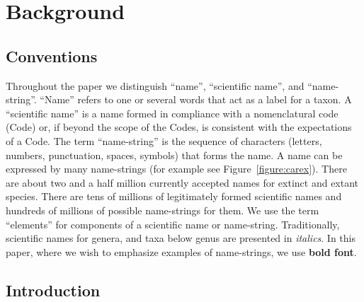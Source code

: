 \documentclass{bmcart}
\begin{document}



\section*{Background}

\subsection*{Conventions}

Throughout the paper we distinguish ``name'', ``scientific name'', and ``name-string''. ``Name'' refers to one or several words that act as a label for a taxon. A ``scientific name'' is a name formed in compliance with a nomenclatural code (Code) or, if beyond the scope of the Codes, is consistent with the expectations of a Code. The term ``name-string'' is the sequence of characters (letters, numbers, punctuation, spaces, symbols) that forms the name. A name can be expressed by many name-strings (for example see Figure~\ref{figure:carex}). There are about two and a half million currently accepted names for extinct and extant species. There are tens of millions of legitimately formed scientific names and hundreds of millions of possible name-strings for them. We use the term ``elements'' for  components of a scientific name or name-string. Traditionally, scientific names for genera, and taxa below genus are presented in \textit{italics}. In this paper, where we wish to emphasize examples of name-strings, we use \textbf{bold font}.

\subsection*{Introduction}
\end{document}
